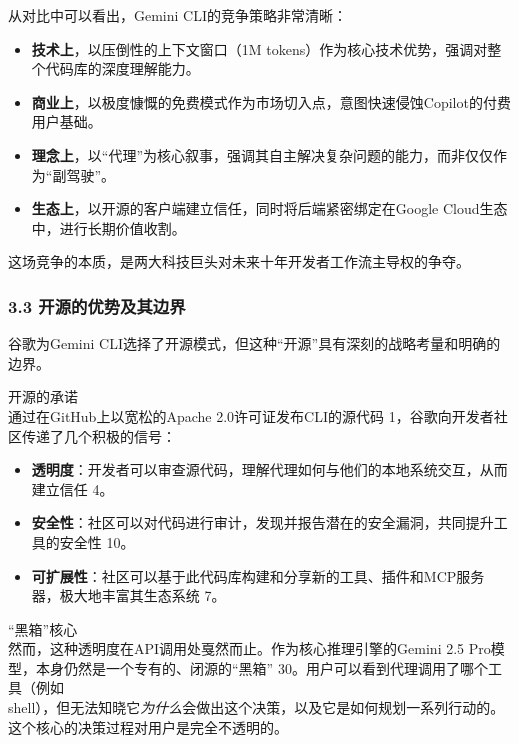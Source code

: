 \documentclass[a4paper,12pt]{article}
\providecommand{\tightlist}{%
  \setlength{\itemsep}{0pt}\setlength{\parskip}{0pt}}
\begin{document}
\begin{multicols}{2}
    从对比中可以看出，Gemini CLI的竞争策略非常清晰：

    \begin{itemize}
    \tightlist
    \item
      \textbf{技术上}，以压倒性的上下文窗口（1M
      tokens）作为核心技术优势，强调对整个代码库的深度理解能力。\\
    \item
      \textbf{商业上}，以极度慷慨的免费模式作为市场切入点，意图快速侵蚀Copilot的付费用户基础。\\
    \item
      \textbf{理念上}，以``代理''为核心叙事，强调其自主解决复杂问题的能力，而非仅仅作为``副驾驶''。\\
    \item
      \textbf{生态上}，以开源的客户端建立信任，同时将后端紧密绑定在Google
      Cloud生态中，进行长期价值收割。
    \end{itemize}

    这场竞争的本质，是两大科技巨头对未来十年开发者工作流主导权的争夺。

    \subsubsection{\texorpdfstring{\textbf{3.3
    开源的优势及其边界}}{3.3 开源的优势及其边界}}\label{ux5f00ux6e90ux7684ux4f18ux52bfux53caux5176ux8fb9ux754c}

    谷歌为Gemini
    CLI选择了开源模式，但这种``开源''具有深刻的战略考量和明确的边界。

    开源的承诺\\
    通过在GitHub上以宽松的Apache 2.0许可证发布CLI的源代码
    1，谷歌向开发者社区传递了几个积极的信号：

    \begin{itemize}
    \tightlist
    \item
      \textbf{透明度}：开发者可以审查源代码，理解代理如何与他们的本地系统交互，从而建立信任
      4。\\
    \item
      \textbf{安全性}：社区可以对代码进行审计，发现并报告潜在的安全漏洞，共同提升工具的安全性
      10。\\
    \item
      \textbf{可扩展性}：社区可以基于此代码库构建和分享新的工具、插件和MCP服务器，极大地丰富其生态系统
      7。
    \end{itemize}

    ``黑箱''核心\\
    然而，这种透明度在API调用处戛然而止。作为核心推理引擎的Gemini 2.5
    Pro模型，本身仍然是一个专有的、闭源的``黑箱''
    30。用户可以看到代理调用了哪个工具（例如\\
    shell），但无法知晓它\emph{为什么}会做出这个决策，以及它是如何规划一系列行动的。这个核心的决策过程对用户是完全不透明的。


\end{multicols}
\end{document}
